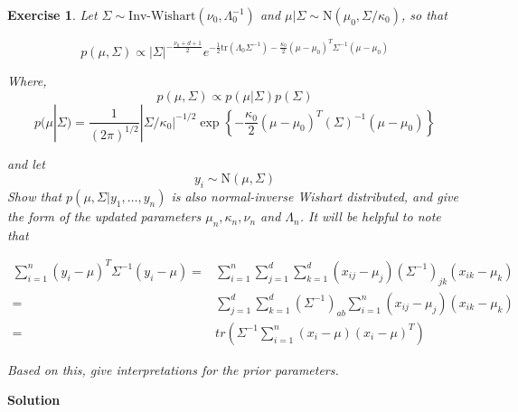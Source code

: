\documentclass[twoside]{article}
\newcounter{lecnum}
\newtheorem{exercise}{Exercise}[lecnum]
\begin{document}
\begin{exercise}
  Let $\Sigma \sim \mbox{Inv-Wishart}(\nu_0, \Lambda_0^{-1})$ and $\mu|\Sigma \sim \mbox{N}(\mu_0, \Sigma/\kappa_0)$, so that

  $$p(\mu,\Sigma) \propto |\Sigma|^{-\frac{\nu_0+d+1}{2}}e^{-\frac{1}{2}\mbox{tr}(\Lambda_0\Sigma^{-1}) - \frac{\kappa_0}{2}(\mu-\mu_0)^T\Sigma^{-1}(\mu-\mu_0)}$$

\color{blue}
Where,
$$ p(\mu,\Sigma) \propto {p(\mu|\Sigma)}{p(\Sigma)}$$
$$p(\mu|\Sigma) = \frac{1}{(2\pi)^{1/2}}|\Sigma/\kappa_0|^{-1/2}\exp\left\{-\frac{\kappa_0}{2}(\mu-\mu_0)^T(\Sigma)^{-1}(\mu-\mu_0)\right\}$$
\color{black}

  and let
  $$y_i \sim \mbox{N}(\mu, \Sigma)$$
  Show that $p(\mu, \Sigma|y_1,\dots,y_n)$ is also normal-inverse Wishart distributed, and give the form of the updated parameters $\mu_n, \kappa_n, \nu_n$ and $\Lambda_n$. It will be helpful to note that

  $$\begin{aligned}\sum_{i=1}^n(y_i-\mu)^T\Sigma^{-1}(y_i-\mu) =& \sum_{i=1}^n\sum_{j=1}^d\sum_{k=1}^d(x_{ij}-\mu_j)(\Sigma^{-1})_{jk}(x_{ik}-\mu_k)\\
    =& \sum_{j=1}^d\sum_{k=1}^d (\Sigma^{-1})_{ab}\sum_{i=1}^n(x_{ij}-\mu_j)(x_{ik}-\mu_k)\\
    =& tr\left(\Sigma^{-1}\sum_{i=1}^n(x_i-\mu)(x_i-\mu)^T\right)\end{aligned}$$
  
  Based on this, give interpretations for the prior parameters.
\end{exercise}

\color{blue}
\textbf{Solution}
\end{document}
